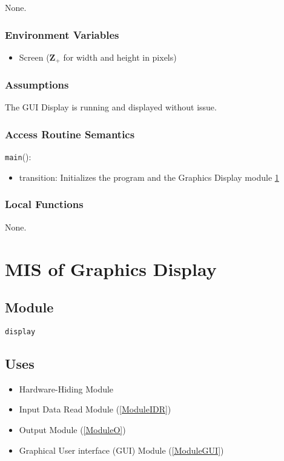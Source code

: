 \documentclass[12pt, titlepage]{article}
\def\code#1{\texttt{#1}}
\begin{document}
None.

\subsubsection{Environment Variables}

\begin{itemize}
  \item Screen ($\mathbf{Z}_{+}$ for width and height in pixels)
\end{itemize}

\subsubsection{Assumptions}

The GUI Display is running and displayed without issue.

\subsubsection{Access Routine Semantics}

\noindent \code{main}():
\begin{itemize}
  \item transition: Initializes the program and the Graphics Display module \ref{ModuleGD}
\end{itemize}

\subsubsection{Local Functions}

None.

\section{MIS of Graphics Display} \label{ModuleGD} 

\subsection{Module}

\code{display}

\subsection{Uses}

\begin{itemize}
  \item Hardware-Hiding Module  
  \item Input Data Read Module (\ref{ModuleIDR})
  \item Output Module (\ref{ModuleO})
  \item Graphical User interface (GUI) Module (\ref{ModuleGUI})
\end{itemize}
\end{document}
